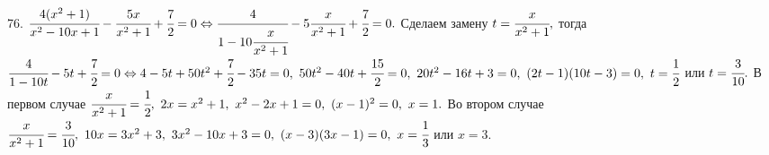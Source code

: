 76. $\cfrac{4(x^2+1)}{x^2-10x+1}-\cfrac{5x}{x^2+1}+\cfrac{7}{2}=0\Leftrightarrow\cfrac{4}{1-10\cfrac{x}{x^2+1}}-5\cfrac{x}{x^2+1}+\cfrac{7}{2}=0.$ Сделаем замену $t=\cfrac{x}{x^2+1},$ тогда $\cfrac{4}{1-10t}-5t+\cfrac{7}{2}=0\Leftrightarrow 4-5t+50t^2+\cfrac{7}{2}-35t=0,\
50t^2-40t+\cfrac{15}{2}=0,\ 20t^2-16t+3=0,\ (2t-1)(10t-3)=0,\ t=\cfrac{1}{2}$ или $t=\cfrac{3}{10}.$ В первом случае $\cfrac{x}{x^2+1}=\cfrac{1}{2},\
2x=x^2+1,\ x^2-2x+1=0,\ (x-1)^2=0,\ x=1.$ Во втором случае $\cfrac{x}{x^2+1}=\cfrac{3}{10},\ 10x=3x^2+3,\ 3x^2-10x+3=0,\ (x-3)(3x-1)=0,\ x=\cfrac{1}{3}$ или $x=3.$\\
